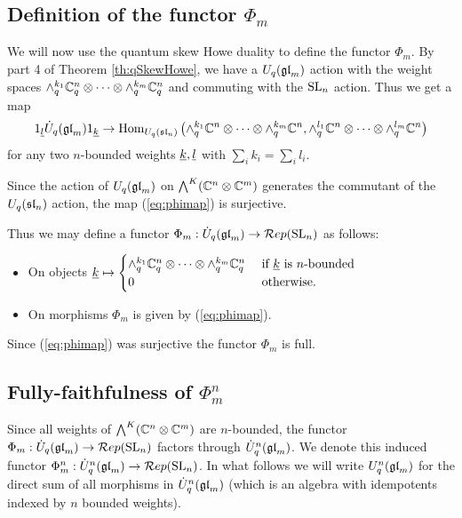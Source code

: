 \documentclass[10pt,leqno]{article}
\begin{document}
\subsection{Definition of the functor $\Phi_m$}

We will now use the quantum skew Howe duality to define the functor $\Phi_m$. By part 4 of Theorem \ref{th:qSkewHowe}, we have a $U_q(\gl_m)$ action with the weight spaces $\alt^{k_1}_q \mathbb C_q^n \otimes \cdots \otimes \alt^{k_m}_q \mathbb C_q^n$ and commuting with the $\SL_n$ action. Thus we get a map
\begin{equation}\label{eq:phimap}
\one_\ul{l} \dU(\gl_m) \one_\ul{k} \rightarrow \Hom_{U_q(\sl_n)} \left(\alt^{k_1}_q \mathbb C^n \otimes \cdots \otimes \alt^{k_m}_q \mathbb C^n, \alt^{l_1}_q \mathbb C^n \otimes \cdots \otimes \alt^{l_m}_q \mathbb C^n\right)
\end{equation}
for any two $n$-bounded weights $\ul{k}, \ul{l}$ with $\sum_i k_i = \sum_i l_i $.

Since the action of $U_q(\gl_m)$  on $\Alt^K(\mathbb C^n \otimes \mathbb C^m) $ generates the commutant of the $U_q(\sl_n)$ action, the map (\ref{eq:phimap}) is surjective.

Thus we may define a functor $\Phi_m: \dU(\gl_m) \rightarrow \Rep(\SL_n)$ as follows:
\begin{itemize}
\item On objects
$\ul{k} \mapsto
\begin{cases}
\alt^{k_1}_q \mathbb C_q^n \otimes \cdots \otimes \alt^{k_m}_q \mathbb C_q^n & \text{ if } \ul{k} \text{ is } n\text{-bounded } \\
0 & \text{ otherwise.}
\end{cases}$
\item On morphisms $ \Phi_m $ is given by (\ref{eq:phimap}).
\end{itemize}
Since (\ref{eq:phimap}) was surjective the functor $\Phi_m$ is full.

\subsection{Fully-faithfulness of $ \Phi_m^n$}
\label{sec:fully-faithful}

Since all weights of $\Alt^K(\mathbb{C}^n \otimes \mathbb{C}^m)$ are $ n$-bounded, the functor $\Phi_m: \dU(\gl_m)\rightarrow \Rep(\SL_n)$ factors through $\dU^n(\gl_m)$. We denote this induced functor $\Phi_m^n: \dU^n(\gl_m) \rightarrow \Rep(\SL_n)$. In what follows we will write $U_q^n(\gl_m)$ for the direct sum of all morphisms in $\dU^n(\gl_m)$ (which is an algebra with idempotents indexed by $n$ bounded weights). 
\end{document}
